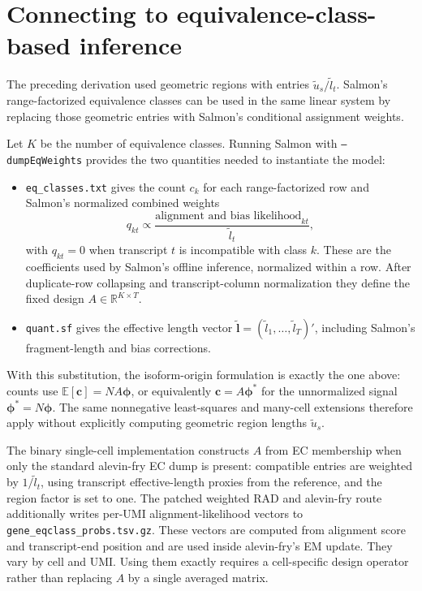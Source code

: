 \documentclass[11pt]{article}
\begin{document}
\section*{Connecting to equivalence-class-based inference}

The preceding derivation used geometric regions with entries
\(\tilde{u}_s/\tilde{l}_t\). Salmon's range-factorized equivalence classes can
be used in the same linear system by replacing those geometric entries with
Salmon's conditional assignment weights.

Let \(K\) be the number of equivalence classes. Running Salmon with
\texttt{--dumpEqWeights} provides the two quantities needed to instantiate the
model:
\begin{itemize}[leftmargin=*]
  \item \texttt{eq\_classes.txt} gives the count \(c_k\) for each
  range-factorized row and Salmon's normalized combined weights
  \[
    q_{kt} \propto
    \frac{\text{alignment and bias likelihood}_{kt}}{\tilde l_t},
  \]
  with \(q_{kt}=0\) when transcript \(t\) is incompatible with class \(k\).
  These are the coefficients used by Salmon's offline inference, normalized
  within a row. After duplicate-row collapsing and transcript-column
  normalization they define the fixed design
  \(A \in \mathbb{R}^{K \times T}\).
  \item \texttt{quant.sf} gives the effective length vector
  \(\tilde{\bm{l}}=(\tilde{l}_1,\ldots,\tilde{l}_T)'\), including Salmon's
  fragment-length and bias corrections.
\end{itemize}

With this substitution, the isoform-origin formulation is exactly the one above:
counts use \(\mathbb{E}[\bm{c}]=N A\bm{\phi}\), or equivalently
\(\bm{c}=A\bm{\phi}^*\) for the unnormalized signal
\(\bm{\phi}^*=N\bm{\phi}\). The same nonnegative least-squares and many-cell
extensions therefore apply without explicitly computing geometric region
lengths \(\tilde{u}_s\).

The binary single-cell implementation constructs \(A\) from EC membership
when only the standard alevin-fry EC dump is present: compatible entries are
weighted by \(1/\tilde{l}_t\), using transcript effective-length proxies from
the reference, and the region factor is set to one. The patched weighted RAD
and alevin-fry route additionally writes per-UMI alignment-likelihood vectors
to \texttt{gene\_eqclass\_probs.tsv.gz}. These vectors are computed from
alignment score and transcript-end position and are used inside alevin-fry's
EM update. They vary by cell and UMI. Using them exactly requires a
cell-specific design operator rather than replacing \(A\) by a single averaged
matrix.
\end{document}
